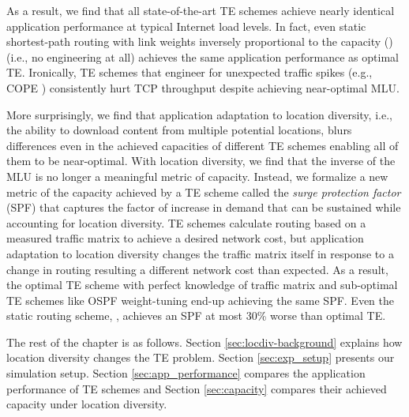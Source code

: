 As a result, we find that all state-of-the-art TE schemes achieve nearly identical application performance at typical Internet load levels. In fact, even static shortest-path routing with link weights inversely proportional to the capacity (\invcap) (i.e., no engineering at all) achieves the same application performance as optimal TE. Ironically, TE schemes that engineer for unexpected traffic spikes (e.g., COPE \cite{COPE}) consistently hurt TCP throughput despite achieving near-optimal MLU.

More surprisingly, we find that application adaptation to location diversity,  i.e., the ability to download content from multiple potential locations, blurs differences even in the achieved capacities of different TE schemes enabling all of them to be near-optimal. With location diversity, we find that the inverse of the MLU is no longer a meaningful metric of capacity. Instead, we formalize a new metric of the capacity achieved by a TE scheme called the {\em surge protection factor} (SPF) that captures the factor of increase in demand that can be sustained while accounting for location diversity. TE schemes calculate routing based on a measured traffic matrix to achieve a desired network cost, but application adaptation to location diversity changes the traffic matrix itself in response to a change in routing resulting a different network cost than expected. As a result, the optimal TE scheme with perfect knowledge of traffic matrix and sub-optimal TE schemes like OSPF weight-tuning \cite{fortz2000internet} end-up achieving the same SPF. Even the static routing scheme, \invcap, achieves an SPF at most 30\% worse than optimal TE.


The rest of the chapter is as follows. Section \ref{sec:locdiv-background} explains how location diversity changes the TE problem. Section \ref{sec:exp_setup} presents our simulation setup. Section \ref{sec:app_performance} compares the application performance of TE schemes and Section \ref{sec:capacity} compares their achieved capacity under location diversity. 


